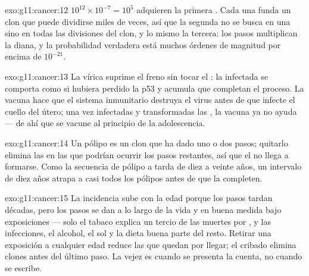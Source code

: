 \begin{solution}{exo:g11:cancer:12}
$10^{12} \times 10^{-7} = 10^5$  adquieren la primera .
Cada una funda un clon que puede dividirse miles de veces, así que la
segunda  no se busca en una  sino en todas las divisiones
del clon, y lo mismo la tercera: los pasos multiplican la diana, y la
probabilidad verdadera está muchos órdenes de magnitud por encima de
$10^{-21}$.
\end{solution}

\begin{solution}{exo:g11:cancer:13}
La  vírica suprime el freno sin tocar el : la 
infectada se comporta como si hubiera perdido la p53 y acumula
 que completan el proceso. La vacuna hace que el sistema
inmunitario destruya el virus antes de que infecte el cuello del útero;
una vez infectadas y transformadas las , la vacuna ya no ayuda
--- de ahí que se vacune al principio de la adolescencia.
\end{solution}

\begin{solution}{exo:g11:cancer:14}
Un pólipo es un clon que ha dado uno o dos pasos; quitarlo elimina las
 en las que podrían ocurrir los pasos restantes, así que el
 no llega a formarse. Como la secuencia de pólipo a  tarda
de diez a veinte años, un intervalo de diez años atrapa a casi todos
los pólipos antes de que la completen.
\end{solution}

\begin{solution}{exo:g11:cancer:15}
La incidencia sube con la edad porque los pasos tardan décadas, pero
los pasos se dan a lo largo de la vida y en buena medida bajo
exposiciones --- solo el tabaco explica un tercio de las muertes por
, y las infecciones, el alcohol, el sol y la dieta buena parte
del resto. Retirar una exposición a cualquier edad reduce las
 que quedan por llegar; el cribado elimina clones antes del
último paso. La vejez es cuando se presenta la cuenta, no cuando se
escribe.
\end{solution}

